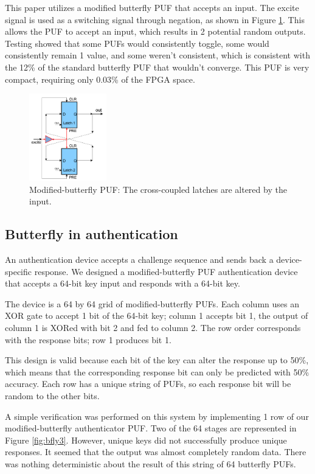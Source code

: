 	This paper utilizes a modified butterfly PUF that accepts an input. The excite signal is used as a switching signal through negation, as shown in Figure \ref{fig:bfly2}. This allows the PUF to accept an input, which results in 2 potential random outputs. Testing showed that some PUFs would consistently toggle, some would consistently remain 1 value, and some weren't consistent, which is consistent with the 12\% of the standard butterfly PUF that wouldn't converge. This PUF is very compact, requiring only 0.03\% of the FPGA space. 
		\begin{figure}[tbph]
			\centering
			\includegraphics[width=0.3\textwidth]{bfly2.png}
			\caption{Modified-butterfly PUF: The cross-coupled latches are altered by the input.}\label{fig:bfly2}
		\end{figure}
		

	\subsection{Butterfly in authentication}
		An authentication device accepts a challenge sequence and sends back a device-specific response. We designed a modified-butterfly PUF authentication device that accepts a 64-bit key input and responds with a 64-bit key. 

		The device is a 64 by 64 grid of modified-butterfly PUFs. Each column uses an XOR gate to accept 1 bit of the 64-bit key; column 1 accepts bit 1, the output of column 1 is XORed with bit 2 and fed to column 2. The row order corresponds with the response bits; row 1 produces bit 1. 

		This design is valid because each bit of the key can alter the response up to 50\%, which means that the corresponding response bit can only be predicted with 50\% accuracy. Each row has a unique string of PUFs, so each response bit will be random to the other bits. 

		A simple verification was performed on this system by implementing 1 row of our modified-butterfly authenticator PUF. Two of the 64 stages are represented in Figure \ref{fig:bfly3}. However, unique keys did not successfully produce unique responses.  It seemed that the output was almost completely random data.  There was nothing deterministic about the result of this string of 64 butterfly PUFs.
		

